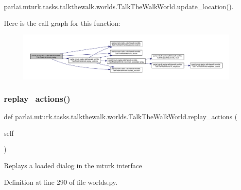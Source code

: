 parlai.\+mturk.\+tasks.\+talkthewalk.\+worlds.\+Talk\+The\+Walk\+World.\+update\+\_\+location().

Here is the call graph for this function\+:
\nopagebreak
\begin{figure}[H]
\begin{center}
\leavevmode
\includegraphics[width=350pt]{classparlai_1_1mturk_1_1tasks_1_1talkthewalk_1_1worlds_1_1TalkTheWalkWorld_a9e6fdd57358e381a4b47163eb6176569_cgraph}
\end{center}
\end{figure}
\mbox{\label{classparlai_1_1mturk_1_1tasks_1_1talkthewalk_1_1worlds_1_1TalkTheWalkWorld_a2d73f3c22c536a60d65166b3ebd55e75}} 
\subsubsection{\texorpdfstring{replay\+\_\+actions()}{replay\_actions()}}
{\footnotesize\ttfamily def parlai.\+mturk.\+tasks.\+talkthewalk.\+worlds.\+Talk\+The\+Walk\+World.\+replay\+\_\+actions (\begin{DoxyParamCaption}\item[{}]{self }\end{DoxyParamCaption})}

\begin{DoxyVerb}Replays a loaded dialog in the mturk interface\end{DoxyVerb}
 

Definition at line 290 of file worlds.\+py.



